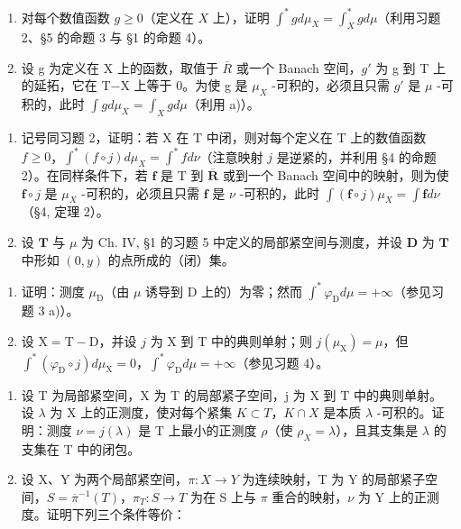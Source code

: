 \begin{enumerate}
\def\labelenumi{\alph{enumi})}
\item
  对每个数值函数 \(g \geqslant 0\)（定义在 \(X\) 上），证明 \(\int^{*} g d\mu_{X} = \int_{X}^{*} g d\mu\)（利用习题 2、§5 的命题 3 与 §1 的命题 4）。
\item
  设 g 为定义在 X 上的函数，取值于 \(\overline{R}\) 或一个 Banach 空间，\(g'\) 为 g 到 T 上的延拓，它在 T−X 上等于 0。为使 g 是 \(\mu_{X}\) -可积的，必须且只需 \(g'\) 是 \(\mu\) -可积的，此时 \(\int g d\mu_{X} = \int_{X} g d\mu\)（利用 a)）。
\end{enumerate}

\begin{enumerate}
\def\labelenumi{\arabic{enumi})}
\setcounter{enumi}{3}
\item
  记号同习题 2，证明：若 X 在 T 中闭，则对每个定义在 T 上的数值函数 \(f \geqslant 0\)，\(\int^{*}(f \circ j) d\mu_{X} = \int^{*} f d\nu\)（注意映射 \(j\) 是逆紧的，并利用 §4 的命题 2）。在同样条件下，若 \(\mathbf{f}\) 是 T 到 \(\overline{\mathbf{R}}\) 或到一个 Banach 空间中的映射，则为使 \(\mathbf{f} \circ j\) 是 \(\mu_{X}\) -可积的，必须且只需 \(\mathbf{f}\) 是 \(\nu\) -可积的，此时 \(\int(\mathbf{f} \circ j)\mu_{X} = \int \mathbf{f} d\nu\)（§4, 定理 2）。
\item
  设 \(\mathbf{T}\) 与 \(\mu\) 为 Ch. IV, §1 的习题 5 中定义的局部紧空间与测度，并设 \(\mathbf{D}\) 为 \(\mathbf{T}\) 中形如 \((0,y)\) 的点所成的（闭）集。
\end{enumerate}

\begin{enumerate}
\def\labelenumi{\alph{enumi})}
\item
  证明：测度 \(\mu_{\mathrm{D}}\)（由 \(\mu\) 诱导到 D 上的）为零；然而 \(\int^{*}\varphi_{\mathrm{D}}d\mu = +\infty\)（参见习题 3 a)）。
\item
  设 \(\mathrm{X} = \mathrm{T} - \mathrm{D}\)，并设 \(j\) 为 \(\mathrm{X}\) 到 \(\mathrm{T}\) 中的典则单射；则 \(j(\mu_{\mathrm{X}}) = \mu\)，但 \(\int^{*} (\varphi_{\mathrm{D}} \circ j) d\mu_{\mathrm{X}} = 0\)，\(\int^{*} \varphi_{\mathrm{D}} d\mu = +\infty\)（参见习题 4）。
\end{enumerate}

\begin{enumerate}
\def\labelenumi{\arabic{enumi})}
\setcounter{enumi}{5}
\item
  设 T 为局部紧空间，X 为 T 的局部紧子空间，j 为 X 到 T 中的典则单射。设 \(\lambda\) 为 X 上的正测度，使对每个紧集 \(K \subset T\)，\(K \cap X\) 是本质 \(\lambda\) -可积的。证明：测度 \(\nu = j(\lambda)\) 是 T 上最小的正测度 \(\rho\)（使 \(\rho_{X} = \lambda\)），且其支集是 \(\lambda\) 的支集在 T 中的闭包。
\item
  设 X、Y 为两个局部紧空间，\(\pi: X \to Y\) 为连续映射，T 为 Y 的局部紧子空间，\(S = \overline{\pi}^{-1}(T)\)，\(\pi_{T}: S \to T\) 为在 S 上与 \(\pi\) 重合的映射，\(\nu\) 为 Y 上的正测度。证明下列三个条件等价：
\end{enumerate}


